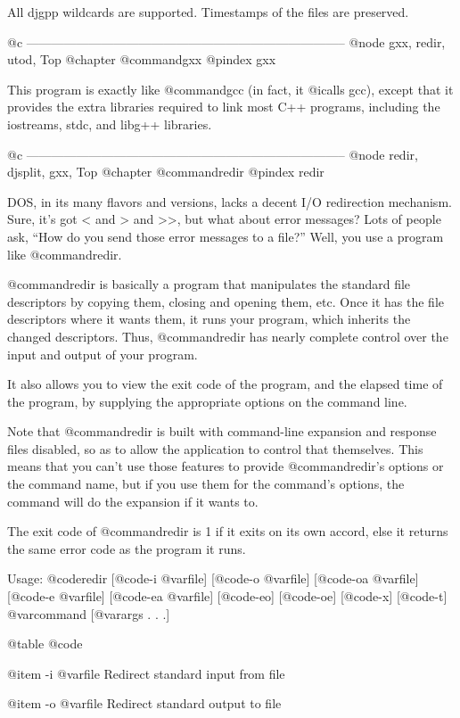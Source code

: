All djgpp wildcards are supported.  Timestamps of the files are preserved.

@c -----------------------------------------------------------------------------
@node gxx, redir, utod, Top
@chapter @command{gxx}
@pindex gxx

This program is exactly like @command{gcc} (in fact, it @i{calls} gcc), except
that it provides the extra libraries required to link most C++ programs,
including the iostreams, stdc, and libg++ libraries.

@c -----------------------------------------------------------------------------
@node    redir, djsplit, gxx, Top
@chapter @command{redir}
@pindex redir

DOS, in its many flavors and versions, lacks a decent I/O redirection
mechanism.  Sure, it's got < and > and >>, but what about error
messages?  Lots of people ask, ``How do you send those error messages
to a file?''  Well, you use a program like @command{redir}.

@command{redir} is basically a program that manipulates the standard file
descriptors by copying them, closing and opening them, etc.  Once it
has the file descriptors where it wants them, it runs your program,
which inherits the changed descriptors.  Thus, @command{redir} has nearly
complete control over the input and output of your program.

It also allows you to view the exit code of the program, and the
elapsed time of the program, by supplying the appropriate options on
the command line.

Note that @command{redir} is built with command-line expansion and response files
disabled, so as to allow the application to control that themselves.
This means that you can't use those features to provide @command{redir}'s options
or the command name, but if you use them for the command's options, the
command will do the expansion if it wants to.

The exit code of @command{redir} is 1 if it exits on its own accord, else it
returns the same error code as the program it runs.

Usage: @code{redir} [@code{-i} @var{file}] [@code{-o} @var{file}]
[@code{-oa} @var{file}] [@code{-e} @var{file}] [@code{-ea} @var{file}]
[@code{-eo}] [@code{-oe}] [@code{-x}] [@code{-t}] @var{command}
[@var{args} . . .]

@table @code

@item -i @var{file}
Redirect standard input from file

@item -o @var{file}
Redirect standard output to file

